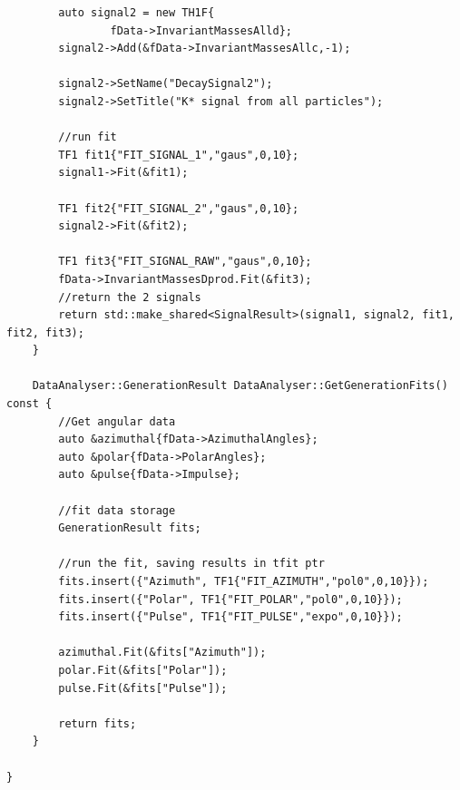 \documentclass[12pt, a4paper]{article}
\begin{document}
\begin{verbatim}
        auto signal2 = new TH1F{
                fData->InvariantMassesAlld};
        signal2->Add(&fData->InvariantMassesAllc,-1);

        signal2->SetName("DecaySignal2");
        signal2->SetTitle("K* signal from all particles");

        //run fit
        TF1 fit1{"FIT_SIGNAL_1","gaus",0,10};
        signal1->Fit(&fit1);

        TF1 fit2{"FIT_SIGNAL_2","gaus",0,10};
        signal2->Fit(&fit2);

        TF1 fit3{"FIT_SIGNAL_RAW","gaus",0,10};
        fData->InvariantMassesDprod.Fit(&fit3);
        //return the 2 signals
        return std::make_shared<SignalResult>(signal1, signal2, fit1, fit2, fit3);
    }

    DataAnalyser::GenerationResult DataAnalyser::GetGenerationFits() const {
        //Get angular data
        auto &azimuthal{fData->AzimuthalAngles};
        auto &polar{fData->PolarAngles};
        auto &pulse{fData->Impulse};

        //fit data storage
        GenerationResult fits;

        //run the fit, saving results in tfit ptr
        fits.insert({"Azimuth", TF1{"FIT_AZIMUTH","pol0",0,10}});
        fits.insert({"Polar", TF1{"FIT_POLAR","pol0",0,10}});
        fits.insert({"Pulse", TF1{"FIT_PULSE","expo",0,10}});

        azimuthal.Fit(&fits["Azimuth"]);
        polar.Fit(&fits["Polar"]);
        pulse.Fit(&fits["Pulse"]);

        return fits;
    }

}
\end{verbatim}
\end{document}
